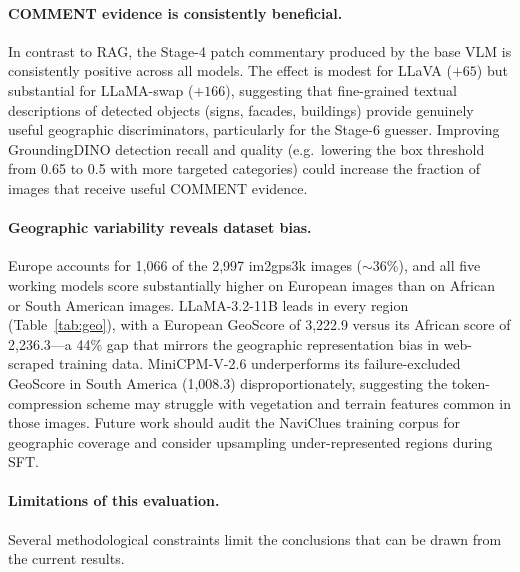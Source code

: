\documentclass[11pt]{article}
\begin{document}
\paragraph{COMMENT evidence is consistently beneficial.}
In contrast to RAG, the Stage-4 patch commentary produced by the base VLM is
consistently positive across all models. The effect is modest for LLaVA ($+65$) but
substantial for LLaMA-swap ($+166$), suggesting that fine-grained textual descriptions
of detected objects (signs, facades, buildings) provide genuinely useful geographic
discriminators, particularly for the Stage-6 guesser. Improving GroundingDINO
detection recall and quality (e.g.\ lowering the box threshold from 0.65 to 0.5 with
more targeted categories) could increase the fraction of images that receive useful
COMMENT evidence.

\paragraph{Geographic variability reveals dataset bias.}
Europe accounts for 1{,}066 of the 2{,}997 im2gps3k images ($\sim$36\%), and all five
working models score substantially higher on European images than on African or South
American images. LLaMA-3.2-11B leads in every region (Table~\ref{tab:geo}), with a
European GeoScore of 3{,}222.9 versus its African score of 2{,}236.3---a 44\% gap
that mirrors the geographic representation bias in web-scraped training data.
MiniCPM-V-2.6 underperforms its failure-excluded GeoScore in South America (1{,}008.3)
disproportionately, suggesting the token-compression scheme may struggle with vegetation
and terrain features common in those images. Future work should audit the NaviClues
training corpus for geographic coverage and consider upsampling under-represented regions
during SFT.

\paragraph{Limitations of this evaluation.}
\label{sec:limitations}
Several methodological constraints limit the conclusions that can be drawn from the
current results.
\end{document}
